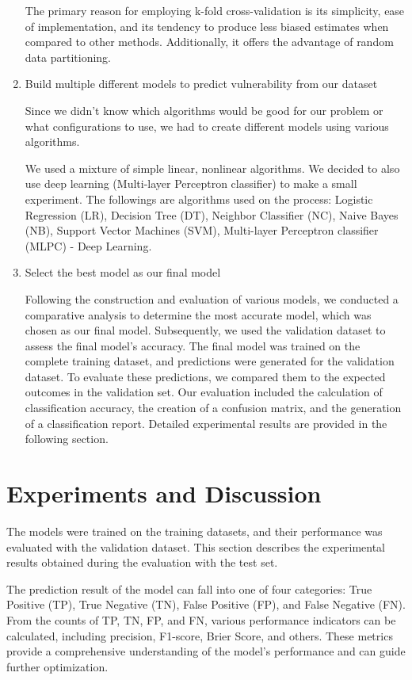 \documentclass[journal,a4paper]{IEEEtran}
\begin{document}
\begin{enumerate}
The primary reason for employing k-fold cross-validation is its simplicity, ease of implementation, and its tendency to produce less biased estimates when compared to other methods. Additionally, it offers the advantage of random data partitioning.

\item Build multiple different models to predict vulnerability from our dataset

Since we didn't know which algorithms would be good for our problem or what configurations to use, we had to create different models using various algorithms.

We used a mixture of simple linear, nonlinear algorithms. We decided to also use deep learning (Multi-layer Perceptron classifier) to make a small experiment. The followings are algorithms used on the process: Logistic Regression (LR), Decision Tree (DT), Neighbor Classifier (NC), Naive Bayes (NB), Support Vector Machines (SVM), Multi-layer Perceptron classifier (MLPC) - Deep Learning.

\item Select the best model as our final model

Following the construction and evaluation of various models, we conducted a comparative analysis to determine the most accurate model, which was chosen as our final model. Subsequently, we used the validation dataset to assess the final model's accuracy. The final model was trained on the complete training dataset, and predictions were generated for the validation dataset. To evaluate these predictions, we compared them to the expected outcomes in the validation set. Our evaluation included the calculation of classification accuracy, the creation of a confusion matrix, and the generation of a classification report. Detailed experimental results are provided in the following section.
\end{enumerate}

\section{Experiments and Discussion}

The models were trained on the training datasets, and their performance was evaluated with the validation dataset. This section describes the experimental results obtained during the evaluation with the test set.

The prediction result of the model can fall into one of four categories: True Positive (TP), True Negative (TN), False Positive (FP), and False Negative (FN). From the counts of TP, TN, FP, and FN, various performance indicators can be calculated, including precision, F1-score, Brier Score, and others. These metrics provide a comprehensive understanding of the model's performance and can guide further optimization.
\end{document}
